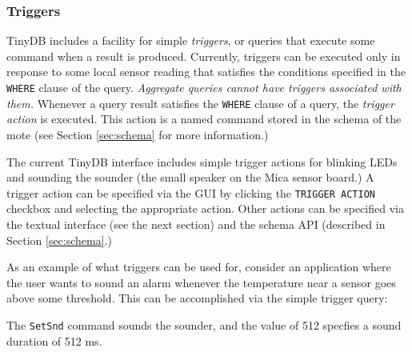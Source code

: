 \documentclass[11pt]{article}
\begin{document}
\subsubsection{Triggers}\label{sec:triggers}

TinyDB includes a facility for simple {\it triggers}, or queries
that execute some command when a result is produced.  Currently, triggers can be
executed only in response to some local sensor reading that satisfies the conditions
specified in the {\tt WHERE} clause of the query.  {\it Aggregate queries cannot
have triggers associated with them.}  Whenever a query result satisfies the
{\tt WHERE} clause of a query, the {\it trigger action} is executed.  This
action is a named command stored in the schema of the mote (see Section \ref{sec:schema}
for more information.)  

The current TinyDB interface includes simple trigger actions for blinking LEDs and
sounding the sounder  (the small speaker on the Mica sensor board.)  A trigger
action can be specified via the GUI by clicking the {\tt TRIGGER ACTION} checkbox and selecting the appropriate
action.  Other actions can be specified via the textual interface (see the next section) and the schema
API (described in Section \ref{sec:schema}.)  

As an example of what triggers can be used for, consider an application where the user wants to sound
an alarm whenever the temperature near a sensor goes above some threshold.  This can be accomplished
via the simple trigger query:


\noindent The {\tt SetSnd} command sounds the sounder, and the value of 512 specfies a sound duration of
512 ms.
\end{document}
